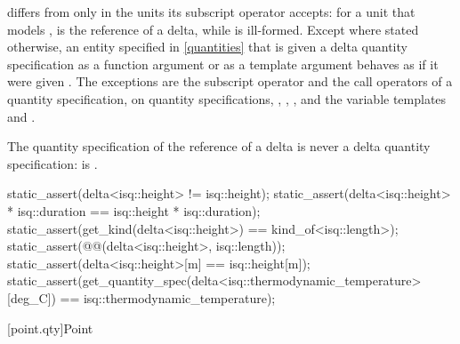 \pnum
{} differs from  only in the units its subscript operator accepts:
for a unit  that models ,
 is the reference of a delta, while  is ill-formed.
Except where stated otherwise,
an entity specified in \ref{quantities} that is given a delta quantity specification 
as a function argument or as a template argument
behaves as if it were given .
The exceptions are
the subscript operator and the call operators of a quantity specification,
 on quantity specifications,
, , ,
and the variable templates  and .
\begin{note}
The quantity specification of the reference of a delta is never a delta quantity specification:
 is .
\end{note}
\begin{example}
\begin{codeblock}
static_assert(delta<isq::height> != isq::height);
static_assert(delta<isq::height> * isq::duration == isq::height * isq::duration);
static_assert(get_kind(delta<isq::height>) == kind_of<isq::length>);
static_assert(@@(delta<isq::height>, isq::length));
static_assert(delta<isq::height>[m] == isq::height[m]);
static_assert(get_quantity_spec(delta<isq::thermodynamic_temperature>[deg_C]) ==
              isq::thermodynamic_temperature);
\end{codeblock}
\end{example}

[point.qty]{Point}

